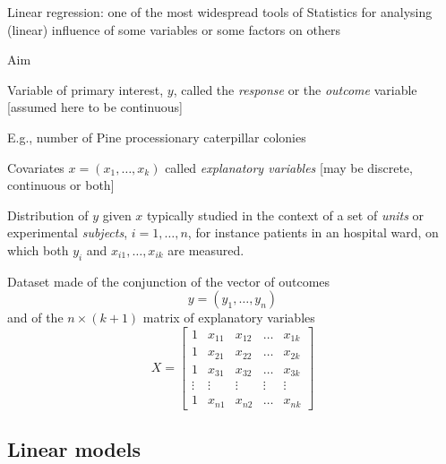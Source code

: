 \begin{slide}
\end{slide}\begin{slide}

Linear regression: one of the most widespread tools of Statistics for analysing (linear) influence 
of some variables or some factors on others

\vs\pause
\begin{block}{Aim}{\centerline{}}\end{block}

\end{slide}\begin{slide}

Variable of primary interest, $y$, called the \textit{response} or the \textit{outcome} variable
[assumed here to be continuous]

\begin{flushright}E.g., number of Pine processionary caterpillar colonies\end{flushright}

\pause
Covariates $x=(x_1,\ldots,x_k)$ called \textit{explanatory variables} [may be discrete, 
continuous or both]

\pause
\vs Distribution of $y$ given $x$ typically studied in the context of a set of \textit{units} or
experimental \textit{subjects},  $i=1,\ldots,n$, for instance patients in an hospital ward,
on which both $y_i$ and $x_{i1},\ldots,x_{ik}$ are measured.

\end{slide}\begin{slide}

Dataset made of the conjunction of the vector of outcomes
$$
y=\left(y_1,\ldots,y_n\right)
$$ 
\pause
and of the $n\times (k+1)$ matrix of explanatory variables
$$
X=\left[\begin{array}{ccccc}
 1      & x_{11} & x_{12} & \ldots & x_{1k} \\
 1      & x_{21} & x_{22} & \ldots & x_{2k} \\
 1      & x_{31} & x_{32} & \ldots & x_{3k} \\
 \vdots & \vdots & \vdots & \vdots & \vdots \\
 1      & x_{n1} & x_{n2} & \ldots & x_{nk}
\end{array}\right]
$$

\end{slide}\subsection{Linear models}
